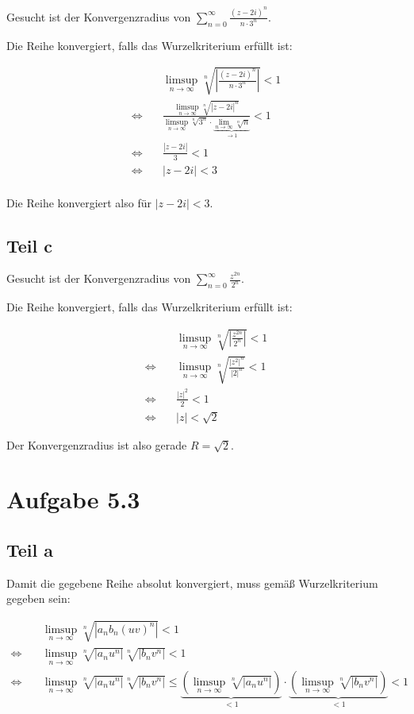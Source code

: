 \documentclass[a4paper,german,12pt,smallheadings]{scrartcl}
\begin{document}
Gesucht ist der Konvergenzradius von $\sum\limits_{n=0}^{\infty} \frac{(z-2i)^n}{n\cdot3^n}$.

Die Reihe konvergiert, falls das Wurzelkriterium erfüllt ist:

\begin{align*}
  & \limsup_{n \to \infty} \sqrt[n]{\left|\frac{(z-2i)^n}{n\cdot3^n}\right|}<1\\
  \Leftrightarrow\quad& \frac{\limsup\limits_{n \to \infty} \sqrt[n]{|z-2i|^n}}{\limsup\limits_{n \to \infty} \sqrt[n]{3^n} \cdot \underbrace{\lim_{n \to \infty} \sqrt[n]{n}}_{\to 1}} < 1\\
  \Leftrightarrow\quad& \frac{|z-2i|}{3} < 1\\
  \Leftrightarrow\quad& |z-2i| < 3\\
\end{align*}

Die Reihe konvergiert also für $|z-2i| < 3$.

\subsection*{Teil c}
Gesucht ist der Konvergenzradius von $\sum\limits_{n=0}^{\infty} \frac{z^{2n}}{2^n}$.

Die Reihe konvergiert, falls das Wurzelkriterium erfüllt ist:

\begin{align*}
  & \limsup\limits_{n \to \infty} \sqrt[n]{|\frac{z^{2n}}{2^n}|}<1\\
  \Leftrightarrow\quad& \limsup\limits_{n \to \infty} \sqrt[n]{\frac{{|z^2|}^n}{|2|^n}}<1\\
  \Leftrightarrow\quad& \frac{|z|^2}{2}<1\\
  \Leftrightarrow\quad& |z|<\sqrt{2}
  \end{align*}

Der Konvergenzradius ist also gerade $R=\sqrt{2}$.

\section*{Aufgabe 5.3}
\subsection*{Teil a}

Damit die gegebene Reihe absolut konvergiert, muss gemäß Wurzelkriterium gegeben sein:

\begin{align*}
  &\limsup_{n \to \infty} \sqrt[n]{|a_nb_n(uv)^n|} < 1 \\
  \Leftrightarrow\quad& \limsup_{n \to \infty} \sqrt[n]{|a_nu^n|} \sqrt[n]{|b_nv^n|} < 1 \\
  \Leftrightarrow\quad& \limsup_{n \to \infty} \sqrt[n]{|a_nu^n|} \sqrt[n]{|b_nv^n|} \leq \underbrace{\left(\limsup_{n \to \infty} \sqrt[n]{|a_nu^n|}\right)}_{<1} \cdot \underbrace{\left(\limsup_{n \to \infty} \sqrt[n]{|b_nv^n|}\right)}_{<1} < 1 \\
\end{align*}
\end{document}

